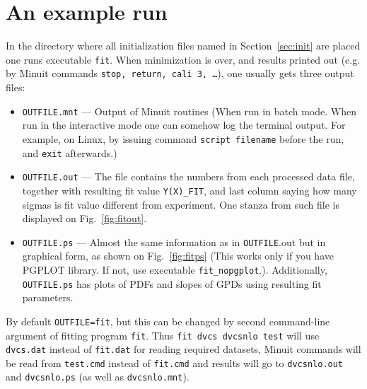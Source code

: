 \documentclass[12pt]{article}
\begin{document}
\section{An example run}
\label{sect:examplerun}

In the directory where all initialization files named in Section~\ref{sec:init} are
placed one runs executable \texttt{fit}. When minimization is over, and results
printed out (e.g. by Minuit commands \texttt{stop, return, cali 3, \dots}), one 
usually gets three output files:
\begin{itemize}
\item \texttt{OUTFILE.mnt}  ---  Output of Minuit routines (When run in batch mode. When
run in the interactive mode one can somehow log the terminal output. For example,
on Linux, by issuing command \texttt{script filename} before the run, and
\texttt{exit} afterwards.)
\item \texttt{OUTFILE.out}   ---  
The file contains the numbers from each processed data file, together with
resulting fit value \texttt{Y(X)\_FIT},
and last column saying how many sigmas is fit value different from experiment.
One stanza from such file is displayed on Fig.~\ref{fig:fitout}.
\item \texttt{OUTFILE.ps}    ---  Almost the same information as 
in \texttt{OUTFILE}.out but in graphical form, as shown on
Fig.~\ref{fig:fitps}  (This works only if you have PGPLOT library. If not, use
executable \texttt{fit\_nopgplot}.). Additionally, \texttt{OUTFILE.ps} has plots
of PDFs and slopes of GPDs using resulting fit parameters.
\end{itemize}

By default \texttt{OUTFILE=fit}, but this can be changed by second command-line
argument of fitting program \texttt{fit}. Thus \texttt{fit  dvcs dvcsnlo test}
will use \texttt{dvcs.dat} instead of \texttt{fit.dat} for reading required
datasets, Minuit commands will be read from \texttt{test.cmd} instead of
\texttt{fit.cmd} and results will go to \texttt{dvcsnlo.out} and \texttt{dvcsnlo.ps} (as well as \texttt{dvcsnlo.mnt}).
\end{document}
